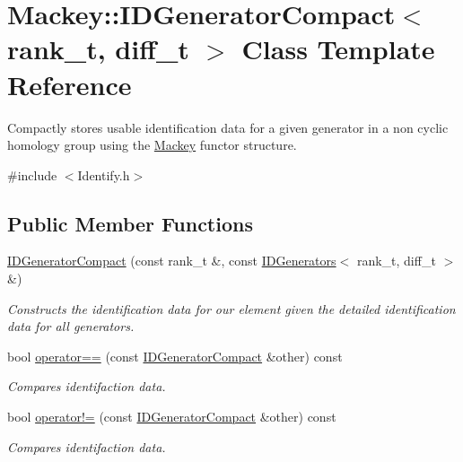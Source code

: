 \hypertarget{classMackey_1_1IDGeneratorCompact}{}\section{Mackey\+:\+:I\+D\+Generator\+Compact$<$ rank\+\_\+t, diff\+\_\+t $>$ Class Template Reference}
\label{classMackey_1_1IDGeneratorCompact}


Compactly stores usable identification data for a given generator in a non cyclic homology group using the \hyperlink{namespaceMackey}{Mackey} functor structure.  




{\ttfamily \#include $<$Identify.\+h$>$}

\subsection*{Public Member Functions}
\begin{DoxyCompactItemize}
\item 
\hyperlink{classMackey_1_1IDGeneratorCompact_a26a4b6a1cf1ec6be1e63fdecaf142b66}{I\+D\+Generator\+Compact} (const rank\+\_\+t \&, const \hyperlink{classMackey_1_1IDGenerators}{I\+D\+Generators}$<$ rank\+\_\+t, diff\+\_\+t $>$ \&)
\begin{DoxyCompactList}\small\item\em Constructs the identification data for our element given the detailed identification data for all generators. \end{DoxyCompactList}\item 
bool \hyperlink{classMackey_1_1IDGeneratorCompact_a44f930a793451c67a34101809930a2e6}{operator==} (const \hyperlink{classMackey_1_1IDGeneratorCompact}{I\+D\+Generator\+Compact} \&other) const
\begin{DoxyCompactList}\small\item\em Compares identifaction data. \end{DoxyCompactList}\item 
bool \hyperlink{classMackey_1_1IDGeneratorCompact_a6c421e5744b9bc1b6215f2eea864fbdd}{operator!=} (const \hyperlink{classMackey_1_1IDGeneratorCompact}{I\+D\+Generator\+Compact} \&other) const
\begin{DoxyCompactList}\small\item\em Compares identifaction data. \end{DoxyCompactList}\end{DoxyCompactItemize}
